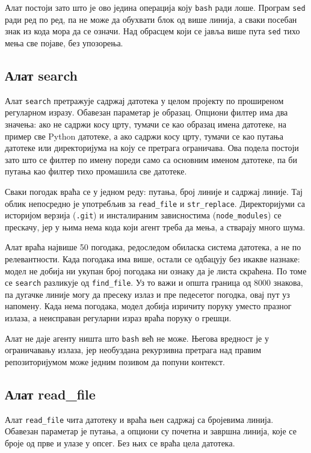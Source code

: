 \documentclass[12pt,a4paper]{report}
\begin{document}
	Алат постоји зато што је ово једина операција коју \texttt{bash} ради лоше.
	Програм \texttt{sed} ради ред по ред, па не може да обухвати блок од више
	линија, а сваки посебан знак из кода мора да се означи. Над обрасцем који се
	јавља више пута \texttt{sed} тихо мења све појаве, без упозорења.

	\subsection{Алат search}

	Алат \texttt{search} претражује садржај датотека у целом пројекту по
	проширеном регуларном изразу. Обавезан параметар је образац. Опциони филтер
	има два значења: ако не садржи косу црту, тумачи се као образац имена
	датотеке, на пример све Python датотеке, а ако садржи косу црту, тумачи се
	као путања датотеке или директоријума на коју се претрага ограничава. Ова
	подела постоји зато што се филтер по имену пореди само са основним именом
	датотеке, па би путања као филтер тихо промашила све датотеке.

	Сваки погодак враћа се у једном реду: путања, број линије и садржај линије.
	Тај облик непосредно је употребљив за \texttt{read\_file} и
	\texttt{str\_replace}. Директоријуми са историјом верзија (\texttt{.git}) и
	инсталираним зависностима (\texttt{node\_modules}) се прескачу, јер у њима
	нема кода који агент треба да мења, а стварају много шума.

	Алат враћа највише 50 погодака, редоследом обиласка система датотека, а не
	по релевантности. Када погодака има више, остали се одбацују без икакве
	назнаке: модел не добија ни укупан број погодака ни ознаку да је листа
	скраћена. По томе се \texttt{search} разликује од \texttt{find\_file}. Уз то
	важи и општа граница од 8000 знакова, па дугачке линије могу да пресеку
	излаз и пре педесетог погодка, овај пут уз напомену. Када нема погодака,
	модел добија изричиту поруку уместо празног излаза, а неисправан регуларни
	израз враћа поруку о грешци.

	Алат не даје агенту ништа што \texttt{bash} већ не може. Његова вредност је у
	ограничавању излаза, јер необуздана рекурзивна претрага над правим
	репозиторијумом може једним позивом да попуни контекст.

	\subsection{Алат read\_file}

	Алат \texttt{read\_file} чита датотеку и враћа њен садржај са бројевима
	линија. Обавезан параметар је путања, а опциони су почетна и завршна линија,
	које се броје од прве и улазе у опсег. Без њих се враћа цела датотека.
\end{document}
